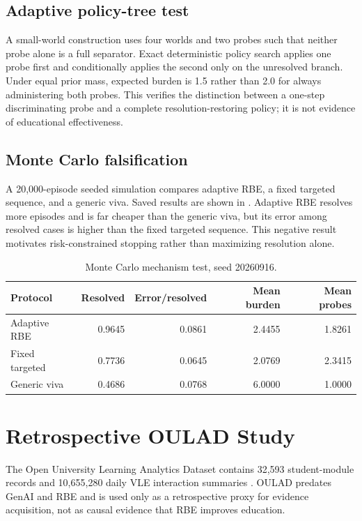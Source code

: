 \documentclass[11pt]{article}
\begin{document}
\subsection{Adaptive policy-tree test}
A small-world construction uses four worlds and two probes such that neither probe alone is a full separator. Exact deterministic policy search applies one probe first and conditionally applies the second only on the unresolved branch. Under equal prior mass, expected burden is 1.5 rather than 2.0 for always administering both probes. This verifies the distinction between a one-step discriminating probe and a complete resolution-restoring policy; it is not evidence of educational effectiveness.

\subsection{Monte Carlo falsification}
A 20,000-episode seeded simulation compares adaptive RBE, a fixed targeted sequence, and a generic viva. Saved results are shown in . Adaptive RBE resolves more episodes and is far cheaper than the generic viva, but its error among resolved cases is higher than the fixed targeted sequence. This negative result motivates risk-constrained stopping rather than maximizing resolution alone.
\begin{table}[t]\centering
\caption{Monte Carlo mechanism test, seed 20260916.}\label{tab:mc}
\begin{tabular}{lrrrr}\toprule Protocol & Resolved & Error/resolved & Mean burden & Mean probes\\\midrule
Adaptive RBE & 0.9645 & 0.0861 & 2.4455 & 1.8261\\
Fixed targeted & 0.7736 & 0.0645 & 2.0769 & 2.3415\\
Generic viva & 0.4686 & 0.0768 & 6.0000 & 1.0000\\\bottomrule\end{tabular}
\end{table}

\section{Retrospective OULAD Study}
The Open University Learning Analytics Dataset contains 32,593 student-module records and 10,655,280 daily VLE interaction summaries \parencite{kuzilek2017oulad}. OULAD predates GenAI and RBE and is used only as a retrospective proxy for evidence acquisition, not as causal evidence that RBE improves education.
\end{document}
